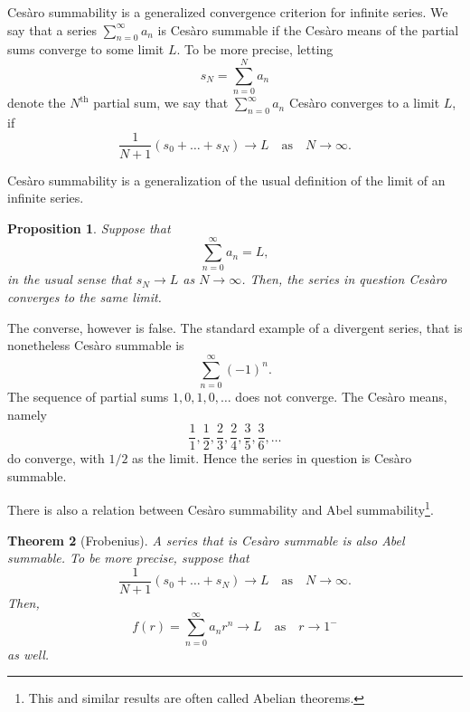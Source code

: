\documentclass[12pt]{article}
\newcommand{\supth}{^{\text{th}}}
\newtheorem{proposition}{Proposition}
\newtheorem{theorem}[proposition]{Theorem}
\begin{document}
Ces\`aro summability is a generalized convergence criterion for infinite
series.  We say that a series $\sum_{n=0}^\infty a_n$ is
Ces\`aro summable if the Ces\`aro means of the partial sums converge to
some limit $L$.  To be more precise, letting $$s_N=\sum_{n=0}^N a_n$$
denote the $N\supth$ partial sum, we say that $\sum_{n=0}^\infty a_n$
Ces\`aro converges to a limit $L$, if
$$\frac{1}{N+1}(s_0+\ldots+s_N) \rightarrow L \quad\text{as}\quad N\rightarrow\infty.$$

Ces\`aro summability is a generalization of the usual definition of the
limit of an infinite series.  
\begin{proposition}
  Suppose that
  $$\sum_{n=0}^\infty a_n = L,$$
  in the usual sense that
  $s_N\rightarrow L$ as $N\rightarrow\infty$.  Then, the series in
  question Ces\`aro converges to the same
  limit.
\end{proposition}
The converse, however is false.  The standard example of a divergent
series, that is nonetheless Ces\`aro summable is
$$\sum_{n=0}^\infty (-1)^n.$$
The sequence of partial sums
$1,0,1,0,\ldots$ does not converge.  The Ces\`aro means, namely
$$\frac{1}{1},\frac{1}{2},\frac{2}{3},\frac{2}{4},\frac{3}{5},\frac{3}{6},
\ldots$$
do converge, with $1/2$ as the limit. Hence the series in
question is Ces\`aro summable.

There is also a relation between Ces\`aro summability and Abel
summability\footnote{This and similar results are often called Abelian
  theorems.}.
\begin{theorem}[Frobenius]
  A series that is Ces\`aro summable is also Abel summable.  To be more
  precise, suppose that
  $$\frac{1}{N+1}(s_0+\ldots+s_N) \rightarrow L \quad\text{as}\quad
  N\rightarrow\infty.$$
  Then,
  $$f(r) = \sum_{n=0}^\infty a_n r^n \rightarrow L \quad\text{as}\quad
  r\rightarrow 1^{-}$$ as well.
\end{theorem}
\end{document}
